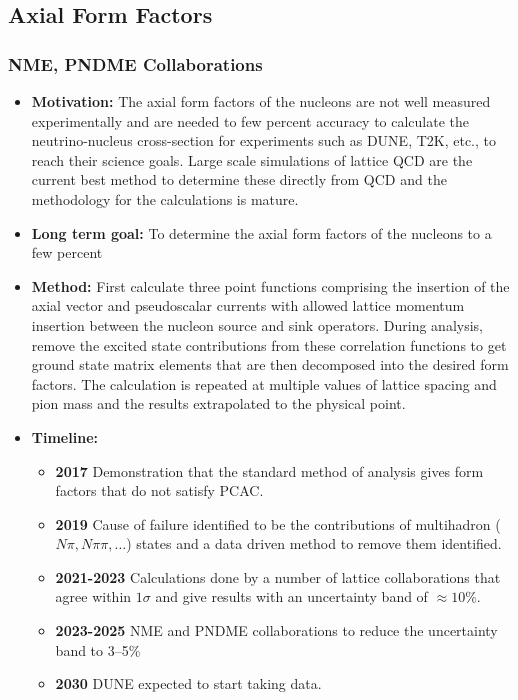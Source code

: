 \documentclass[12pt,hyperpdf]{article}
\begin{document}
\subsection{Axial Form Factors}\label{sec:axff}

\subsubsection{NME, PNDME Collaborations}
\begin{itemize}
    \item{\bf Motivation:} The axial form factors of the nucleons are not well measured experimentally and are
      needed to few percent accuracy to calculate the neutrino-nucleus cross-section for experiments such as DUNE, T2K, etc., to 
      reach their science goals. Large scale simulations of lattice QCD are the current 
      best method to determine these directly from QCD and the methodology for the 
      calculations is mature. 
    \item{\bf Long term goal:} To determine the axial form factors of the nucleons to a few percent 
    \item{\bf Method:} First calculate three point functions comprising the insertion of the axial vector and pseudoscalar currents 
      with allowed lattice  momentum insertion between the nucleon source and sink operators. During analysis, remove 
      the excited state contributions from these correlation functions to get ground state matrix elements that are 
      then decomposed into the desired form factors. The calculation is repeated at multiple values of lattice spacing and 
      pion mass and the results extrapolated to the physical point. 
\item{\bf Timeline:}
\begin{itemize}
    \item{\bf 2017} Demonstration that the standard method of analysis gives form factors that do not satisfy PCAC.
    \item{\bf 2019} Cause of failure identified to be the contributions of multihadron ($N\pi, N\pi\pi, \ldots$) states 
      and a data driven method to remove them identified.
    \item{\bf 2021-2023} Calculations done by a number of lattice collaborations that agree within $1\sigma$ and give results
      with an uncertainty band of $\approx 10\%$.
    \item{\bf 2023-2025} NME and PNDME collaborations to reduce the uncertainty band to 3--5\%
    \item{\bf 2030} DUNE expected to start taking data.
\end{itemize}
\end{itemize}
\end{document}
